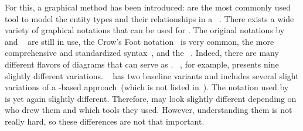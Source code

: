 For this, a graphical method has been introduced:
 are the most commonly used tool to model the entity types and their relationships in a \db~\cite{C2002ERMHEFTALL,C1975TRMTAUVOD,C1976TERMTAUVOD,KW2012ASHOTEDAIM,WF1995DHQDM,B1990CMERMO}.
There exists a wide variety of graphical notations that can be used for .
The original notations by \citeauthor{B1969DSD}~\cite{B1969DSD} and \citeauthor{C1975TRMTAUVOD}~\cite{C1975TRMTAUVOD,C1976TERMTAUVOD} are still in use, the Crow's Foot notation~\cite{E1976BDSMEWACE,CM2000MDMAUDA} is very common, the more comprehensive and standardized  syntax~\cite{FIPSPUB184,ISOIECIEEE2012ITMLP2SASFII}, and the ~\cite{OMG2017OUMLOU,RMHOSMUUIIIIOPPTRS1997UNG,BRJ1999TUMLRM}.
Indeed, there are many different flavors of diagrams that can serve as .
~\cite{S2024D:CDMERDE}, for example, presents nine slightly different variations.
~\cite{SS2005EIDDDFDB:CDDRAAML} has two baseline variants and includes several slight variations of a -based approach~(which is not listed in~\cite{S2024D:CDMERDE}).
The notation used by \citeauthor{V1999C5DMS:CDUTERM}~\cite{V1999C5DMS:CDUTERM} is yet again slightly different.
Therefore,  may look slightly different depending on who drew them and which tools they used.
However, understanding them is not really hard, so these differences are not that important.

